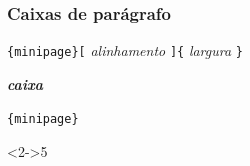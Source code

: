 \documentclass[handout,10pt]{beamer}
\begin{document}
\begin{frame}[fragile]
	\frametitle{Caixas de parágrafo}
	
	\begin{block}{}
		
		\verb|{minipage}[|%
			\textit{alinhamento}%
		\verb|]{|%
			\textit{largura}%
		\verb|}|
		
		\hspace{1em}\textit{\textbf{caixa}}%
		
		\verb|{minipage}|
	\end{block}
	
	\begin{atividade}<2->{5}
	\setlength{\fboxsep}{0pt}
	
		\smallskip
	
		\noindent\hrulefill
		\usebox{\myminipageA}%
		\hrulefill
		\fbox{\usebox{\myminipageB}}%
		\hrulefill
		
	\end{atividade}
		
\end{frame}
\end{document}
